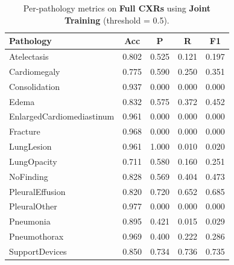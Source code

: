 \begin{table}[H]
\centering
\small
\begin{tabular}{lcccc}
\toprule
\textbf{Pathology} & \textbf{Acc} & \textbf{P} & \textbf{R} & \textbf{F1} \\
\midrule
Atelectasis               & 0.802 & 0.525 & 0.121 & 0.197 \\
Cardiomegaly              & 0.775 & 0.590 & 0.250 & 0.351 \\
Consolidation             & 0.937 & 0.000 & 0.000 & 0.000 \\
Edema                     & 0.832 & 0.575 & 0.372 & 0.452 \\
EnlargedCardiomediastinum & 0.961 & 0.000 & 0.000 & 0.000 \\
Fracture                  & 0.968 & 0.000 & 0.000 & 0.000 \\
LungLesion                & 0.961 & 1.000 & 0.010 & 0.020 \\
LungOpacity               & 0.711 & 0.580 & 0.160 & 0.251 \\
NoFinding                 & 0.828 & 0.569 & 0.404 & 0.473 \\
PleuralEffusion           & 0.820 & 0.720 & 0.652 & 0.685 \\
PleuralOther              & 0.977 & 0.000 & 0.000 & 0.000 \\
Pneumonia                 & 0.895 & 0.421 & 0.015 & 0.029 \\
Pneumothorax              & 0.969 & 0.400 & 0.222 & 0.286 \\
SupportDevices            & 0.850 & 0.734 & 0.736 & 0.735 \\
\bottomrule
\end{tabular}
\caption{Per-pathology metrics on \textbf{Full CXRs} using \textbf{Joint Training} (threshold = 0.5).}
\label{tab:full_joint}
\end{table}


